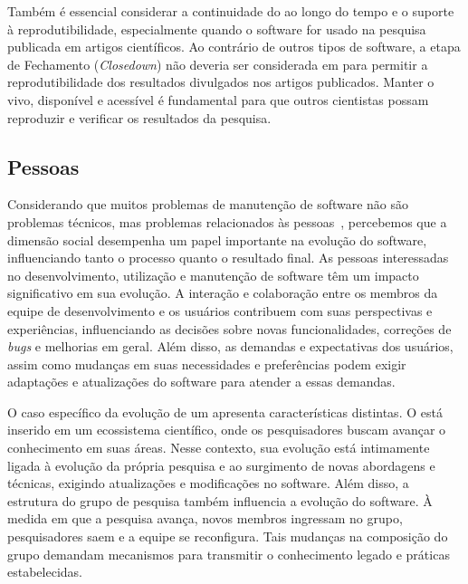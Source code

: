 Também é essencial considerar a continuidade do \RSw ao longo do tempo e o suporte à  reprodutibilidade, especialmente quando o software for usado na pesquisa publicada em artigos científicos. 
Ao contrário de outros tipos de software, a etapa de Fechamento (\textit{Closedown}) não deveria ser considerada em \RSw para permitir a reprodutibilidade dos resultados divulgados nos artigos publicados.
Manter o \RSw vivo, disponível e acessível é fundamental para que outros cientistas possam reproduzir e verificar os resultados da pesquisa.

\subsection{Pessoas} 



Considerando que muitos problemas de manutenção de software não são problemas técnicos, mas problemas relacionados às pessoas~\cite{versen_2020}, percebemos que a dimensão social desempenha um papel importante na evolução do software, influenciando tanto o processo quanto o resultado final. 
As pessoas interessadas no desenvolvimento, utilização e manutenção de software têm um impacto significativo em sua evolução. A interação e colaboração entre os membros da equipe de desenvolvimento e os usuários contribuem com suas perspectivas e experiências, influenciando as decisões sobre novas funcionalidades, correções de \textit{bugs} e melhorias em geral. 
Além disso, as demandas e expectativas dos usuários, assim como  mudanças em suas necessidades e preferências podem exigir adaptações e atualizações do software para atender a essas demandas.

O caso específico da evolução de um \RSw  apresenta características distintas. 
O \RSw está inserido em um ecossistema científico, onde os pesquisadores buscam avançar o conhecimento em suas áreas. 
Nesse contexto, sua evolução está intimamente ligada à evolução da própria pesquisa e ao surgimento de novas abordagens e técnicas, exigindo atualizações e modificações no software. 
Além disso, a estrutura do grupo de pesquisa também influencia a evolução do software. À medida em que a pesquisa avança, novos membros ingressam no grupo, pesquisadores saem e a equipe se reconfigura. Tais mudanças na composição do grupo demandam mecanismos para transmitir o conhecimento legado e práticas estabelecidas.

